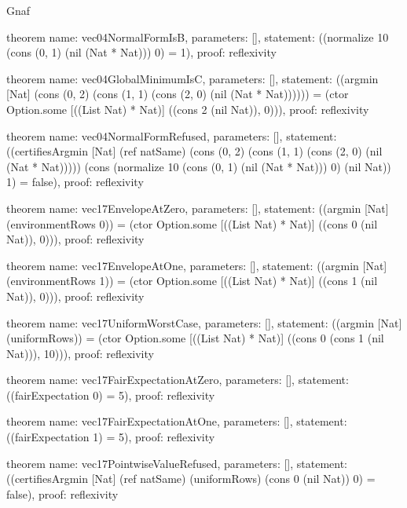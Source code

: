 \begin{lexlean}{Gnaf}
\begin{semanticmodule}
theorem{
  name: vec04NormalFormIsB,
  parameters: [],
  statement: ((normalize 10 (cons (0, 1) (nil (Nat * Nat))) 0) = 1),
  proof: reflexivity{}
}

theorem{
  name: vec04GlobalMinimumIsC,
  parameters: [],
  statement: ((argmin [Nat] (cons (0, 2) (cons (1, 1) (cons (2, 0) (nil (Nat * Nat)))))) = (ctor Option.some [((List Nat) * Nat)] ((cons 2 (nil Nat)), 0))),
  proof: reflexivity{}
}

theorem{
  name: vec04NormalFormRefused,
  parameters: [],
  statement: ((certifiesArgmin [Nat] (ref natSame) (cons (0, 2) (cons (1, 1) (cons (2, 0) (nil (Nat * Nat))))) (cons (normalize 10 (cons (0, 1) (nil (Nat * Nat))) 0) (nil Nat)) 1) = false),
  proof: reflexivity{}
}

theorem{
  name: vec17EnvelopeAtZero,
  parameters: [],
  statement: ((argmin [Nat] (environmentRows 0)) = (ctor Option.some [((List Nat) * Nat)] ((cons 0 (nil Nat)), 0))),
  proof: reflexivity{}
}

theorem{
  name: vec17EnvelopeAtOne,
  parameters: [],
  statement: ((argmin [Nat] (environmentRows 1)) = (ctor Option.some [((List Nat) * Nat)] ((cons 1 (nil Nat)), 0))),
  proof: reflexivity{}
}

theorem{
  name: vec17UniformWorstCase,
  parameters: [],
  statement: ((argmin [Nat] (uniformRows)) = (ctor Option.some [((List Nat) * Nat)] ((cons 0 (cons 1 (nil Nat))), 10))),
  proof: reflexivity{}
}

theorem{
  name: vec17FairExpectationAtZero,
  parameters: [],
  statement: ((fairExpectation 0) = 5),
  proof: reflexivity{}
}

theorem{
  name: vec17FairExpectationAtOne,
  parameters: [],
  statement: ((fairExpectation 1) = 5),
  proof: reflexivity{}
}

theorem{
  name: vec17PointwiseValueRefused,
  parameters: [],
  statement: ((certifiesArgmin [Nat] (ref natSame) (uniformRows) (cons 0 (nil Nat)) 0) = false),
  proof: reflexivity{}
}
\end{semanticmodule}
\end{lexlean}
